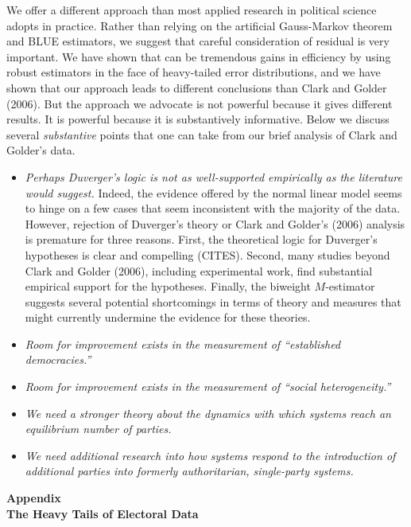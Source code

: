 \documentclass[12pt]{article}
\begin{document}
We offer a different approach than most applied research in political science adopts in practice. Rather than relying on the artificial Gauss-Markov theorem and BLUE estimators, we suggest that careful consideration of residual is very important. We have shown that can be tremendous gains in efficiency by using robust estimators in the face of heavy-tailed error distributions, and we have shown that our approach leads to different conclusions than Clark and Golder (2006). But the approach we advocate is not powerful because it gives different results. It is powerful because it is substantively informative. Below we discuss several \textit{substantive} points that one can take from our brief analysis of Clark and Golder's data.
\begin{itemize}
\item \textit{Perhaps Duverger's logic is not as well-supported empirically as the literature would suggest.} Indeed, the evidence offered by the normal linear model seems to hinge on a few cases that seem inconsistent with the majority of the data. However, rejection of Duverger's theory or Clark and Golder's (2006) analysis is premature for three reasons. First, the theoretical logic for Duverger's hypotheses is clear and compelling (CITES). Second, many studies beyond Clark and Golder (2006), including experimental work, find substantial empirical support for the hypotheses. Finally, the biweight $M$-estimator suggests several potential shortcomings in terms of theory and measures that might currently undermine the evidence for these theories.
\item \textit{Room for improvement exists in the measurement of ``established democracies.''}
\item \textit{Room for improvement exists in the measurement of ``social heterogeneity.''}
\item \textit{We need a stronger theory about the dynamics with which systems reach an equilibrium number of parties.}
\item \textit{We need additional research into how systems respond to the introduction of additional parties into formerly authoritarian, single-party systems.}
\end{itemize}

\singlespace

%



\newpage
\doublespace
\begin{appendix}
\begin{center}
\textbf{{\LARGE Appendix}}\\\vspace{2mm}
\textbf{{\large The Heavy Tails of Electoral Data}}\\\vspace{2mm}

\end{center}
\section{}


\end{appendix}
\end{document}

